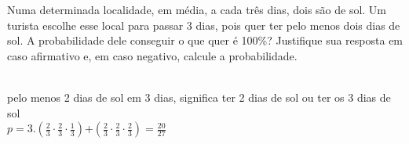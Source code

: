 \begin{ex}
 Numa determinada localidade, em média, a cada três dias, dois são de sol. Um turista escolhe esse local para passar 3 dias, pois quer ter pelo menos dois dias de sol. A probabilidade dele conseguir o que quer é 100\%? Justifique sua resposta em caso afirmativo e, em caso negativo, calcule a probabilidade.
   \begin{sol}
       \phantom{A} \\
     pelo menos 2 dias de sol em 3 dias, significa ter 2 dias de sol ou ter os 3 dias de sol\\
     $p= 3.(\frac{2}{3}\cdot\frac{2}{3}\cdot\frac{1}{3})$\hspace{0.1cm}+\hspace{0.1cm}$(\frac{2}{3}\cdot\frac{2}{3}\cdot\frac{2}{3})=\frac{20}{27}$
   \end{sol}
\end{ex}